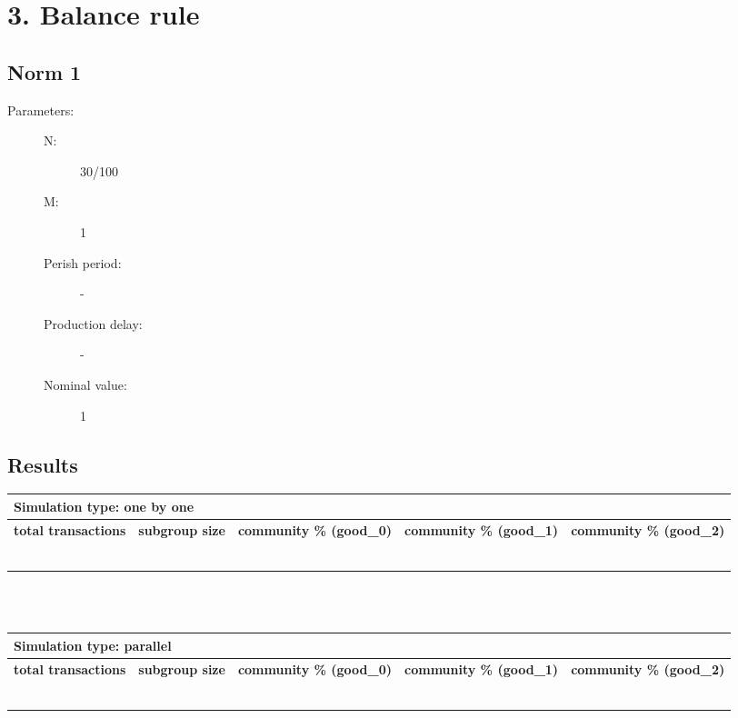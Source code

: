 \documentclass{article}
\begin{document}
\section{3. Balance rule}
\subsection{Norm 1}
\begin{description}
  \item[Parameters:] \hfill
	\begin{description}
  		\item[N:] 30/100
		\item[M:] 1
		\item[Perish period:] -
		\item[Production delay:] -
		\item[Nominal value:] 1
	\end{description}

\end{description}

\subsection{Results}
\begin{tabular}{|  l | c | p{2.5cm} | p{2.5cm} | p{2.5cm} | }
     \multicolumn{5}{l}{\textbf{Simulation type: one by one}} \\ \hline
     \textbf{total transactions} & \textbf{subgroup size} & \textbf{community \% (good\_0)} & \textbf{community \% (good\_1)}  & \textbf{community \% (good\_2)} \\ \hline
     &  & & &  \\ \hline
     &  & & & \\ \hline
     &  & & & \\ \hline
     &  & & &  \\ \hline
     &  & & &  \\ \hline
     &  & & & \\ \hline
\end{tabular}
\\
\\
\begin{tabular}{|  l | c | p{2.5cm} | p{2.5cm} | p{2.5cm} | }
     \multicolumn{5}{l}{\textbf{Simulation type: parallel}} \\ \hline
     \textbf{total transactions} & \textbf{subgroup size} & \textbf{community \% (good\_0)} & \textbf{community \% (good\_1)}  & \textbf{community \% (good\_2)} \\ \hline
     &  & & &  \\ \hline
     &  & & & \\ \hline
     &  & & & \\ \hline
     &  & & &  \\ \hline
     &  & & &  \\ \hline
     &  & & & \\ \hline
\end{tabular}
\end{document}
